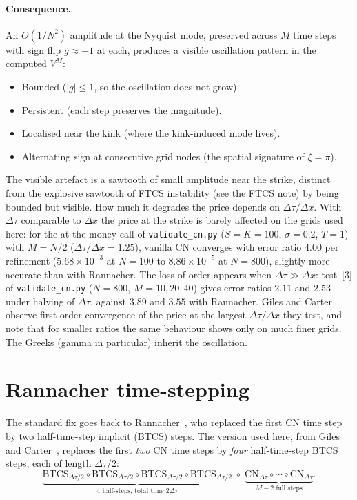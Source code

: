 \documentclass[11pt,a4paper]{article}
\begin{document}
\paragraph{Consequence.} An $O(1/N^2)$ amplitude at the Nyquist mode,
preserved across $M$ time steps with sign flip $g \approx -1$ at each,
produces a visible oscillation pattern in the computed $V^M$:
\begin{itemize}[leftmargin=2em]
\item Bounded ($|g| \le 1$, so the oscillation does not grow).
\item Persistent (each step preserves the magnitude).
\item Localised near the kink (where the kink-induced mode lives).
\item Alternating sign at consecutive grid nodes (the spatial
signature of $\xi = \pi$).
\end{itemize}
The visible artefact is a sawtooth of small amplitude near the
strike, distinct from the explosive sawtooth of FTCS instability
(see the FTCS note) by being bounded but visible. How much it
degrades the price depends on $\Delta\tau/\Delta x$. With $\Delta\tau$
comparable to $\Delta x$ the price at the strike is barely affected on
the grids used here: for the at-the-money call of \texttt{validate\_cn.py}
($S = K = 100$, $\sigma = 0.2$, $T = 1$) with $M = N/2$
($\Delta\tau/\Delta x = 1.25$), vanilla CN converges with error ratio
$4.00$ per refinement ($5.68\times10^{-3}$ at $N = 100$ to
$8.86\times10^{-5}$ at $N = 800$), slightly more accurate than with
Rannacher. The loss of order appears when $\Delta\tau \gg \Delta x$:
test~[3] of \texttt{validate\_cn.py} ($N = 800$, $M = 10, 20, 40$) gives
error ratios $2.11$ and $2.53$ under halving of $\Delta\tau$, against
$3.89$ and $3.55$ with Rannacher. Giles and Carter~\cite{GilesCarter2006}
observe first-order convergence of the price at the largest
$\Delta\tau/\Delta x$ they test, and note that for smaller ratios the
same behaviour shows only on much finer grids. The Greeks (gamma in
particular) inherit the oscillation.

\section{Rannacher time-stepping}

The standard fix goes back to Rannacher~\cite{Rannacher1984}, who
replaced the first CN time step by two half-time-step implicit (BTCS)
steps. The version used here, from Giles and
Carter~\cite{GilesCarter2006}, replaces the first \emph{two} CN time
steps by \emph{four} half-time-step BTCS steps, each of length
$\Delta\tau/2$:
\begin{equation}
\underbrace{\mathrm{BTCS}_{\Delta\tau/2}\circ\mathrm{BTCS}_{\Delta\tau/2}\circ\mathrm{BTCS}_{\Delta\tau/2}\circ\mathrm{BTCS}_{\Delta\tau/2}}_{\text{4 half-steps, total time }2\Delta\tau}
\;\circ\;
\underbrace{\mathrm{CN}_{\Delta\tau} \circ \cdots \circ \mathrm{CN}_{\Delta\tau}}_{M-2\text{ full steps}}.
\label{eq:rannacher}
\end{equation}
\end{document}

